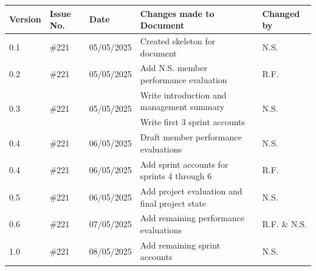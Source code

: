 \documentclass[a4paper]{project}
\begin{document}
	\begin{tabular}{|l|l|l|l|l|}
		\hline
		Version              & Issue No.              & Date                        & Changes made to Document                       & Changed by            \\ \hline
		0.1                  & \#221                  & 05/05/2025                  & Created skeleton for document                  & N.S.                  \\ \hline
		0.2                  & \#221                  & 05/05/2025                  & Add N.S. member performance evaluation         & R.F.                  \\ \hline
		\multirow{2}{*}{0.3} & \multirow{2}{*}{\#221} & \multirow{2}{*}{05/05/2025} & Write introduction and management summary      & \multirow{2}{*}{N.S.} \\
		                     &                        &                             & Write first 3 sprint accounts                  &                       \\ \hline
		0.4                  & \#221                  & 06/05/2025                  & Draft member performance evaluations           & N.S.                  \\ \hline
		0.4                  & \#221                  & 06/05/2025                  & Add sprint accounts for sprints 4 through 6    & R.F.                  \\ \hline
		0.5                  & \#221                  & 06/05/2025                  & Add project evaluation and final project state & N.S.                  \\ \hline
		0.6                  & \#221                  & 07/05/2025                  & Add remaining performance evaluations          & R.F. \& N.S.          \\ \hline
		1.0                  & \#221                  & 08/05/2025                  & Add remaining sprint accounts                  & N.S.                  \\ \hline
	\end{tabular}
	
	\label{thelastpage}
\end{document}
